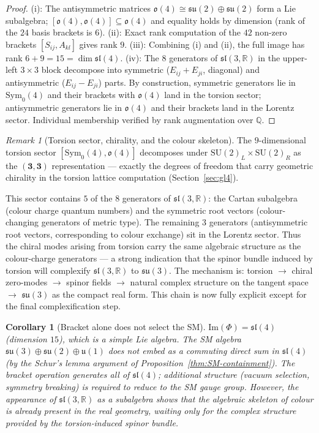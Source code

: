 \documentclass[11pt,a4paper]{article}
\theoremstyle{plain}
\newtheorem{corollary}[theorem]{Corollary}
\theoremstyle{definition}
\theoremstyle{remark}
\newtheorem{remark}[theorem]{Remark}
\begin{document}
\begin{proof}
(i): The antisymmetric matrices $\mathfrak{o}(4) \cong \mathfrak{su}(2)\oplus\mathfrak{su}(2)$ form a Lie subalgebra;
$[\mathfrak{o}(4),\mathfrak{o}(4)]\subseteq\mathfrak{o}(4)$ and equality holds by dimension (rank of the $24$ basis brackets is $6$).
(ii): Exact rank computation of the $42$ non-zero brackets $[S_{ij},A_{kl}]$ gives rank $9$.
(iii): Combining (i) and (ii), the full image has rank $6+9=15 = \dim\mathfrak{sl}(4)$.
(iv): The $8$ generators of $\mathfrak{sl}(3,\mathbb{R})$ in the upper-left 
$3\times 3$ block decompose into symmetric ($E_{ij}+E_{ji}$, diagonal) and 
antisymmetric ($E_{ij}-E_{ji}$) parts.  By construction, symmetric generators 
lie in $\mathrm{Sym}_0(4)$ and their brackets with $\mathfrak{o}(4)$ land in 
the torsion sector; antisymmetric generators lie in $\mathfrak{o}(4)$ and their 
brackets land in the Lorentz sector.  Individual membership verified by rank 
augmentation over $\mathbb{Q}$.
\end{proof}

\begin{remark}[Torsion sector, chirality, and the colour skeleton]
The $9$-dimensional torsion sector $[\mathrm{Sym}_0(4),\mathfrak{o}(4)]$ decomposes under $\mathrm{SU}(2)_L\times\mathrm{SU}(2)_R$
as the $(\mathbf{3},\mathbf{3})$ representation --- exactly the degrees of freedom that carry geometric chirality
in the torsion lattice computation (Section~\ref{sec:gl4}).

This sector contains $5$ of the $8$ generators of $\mathfrak{sl}(3,\mathbb{R})$:
the Cartan subalgebra (colour charge quantum numbers) and the symmetric root
vectors (colour-changing generators of metric type).  The remaining $3$ generators
(antisymmetric root vectors, corresponding to colour exchange) sit in the Lorentz
sector.  Thus the chiral modes arising from torsion carry the same algebraic
structure as the colour-charge generators --- a strong indication that the spinor
bundle induced by torsion will complexify $\mathfrak{sl}(3,\mathbb{R})$ to
$\mathfrak{su}(3)$.  The mechanism is:
torsion $\to$ chiral zero-modes $\to$ spinor fields $\to$ natural complex
structure on the tangent space $\to$ $\mathfrak{su}(3)$ as the compact real form.
This chain is now fully explicit except for the final complexification step.
\end{remark}

\begin{corollary}[Bracket alone does not select the SM]
$\mathrm{Im}(\Phi) = \mathfrak{sl}(4)$ (dimension $15$), which is a simple Lie algebra.
The SM algebra $\mathfrak{su}(3) \oplus \mathfrak{su}(2) \oplus \mathfrak{u}(1)$
does not embed as a commuting direct sum in $\mathfrak{sl}(4)$ 
(by the Schur's lemma argument of Proposition~\ref{thm:SM-containment}).
The bracket operation generates \emph{all} of $\mathfrak{sl}(4)$;
additional structure (vacuum selection, symmetry breaking) is required 
to reduce to the SM gauge group.  However, the appearance of $\mathfrak{sl}(3,\mathbb{R})$
as a subalgebra shows that the algebraic skeleton of colour is already present in the
real geometry, waiting only for the complex structure provided by the torsion‑induced
spinor bundle.
\end{corollary}
\end{document}
